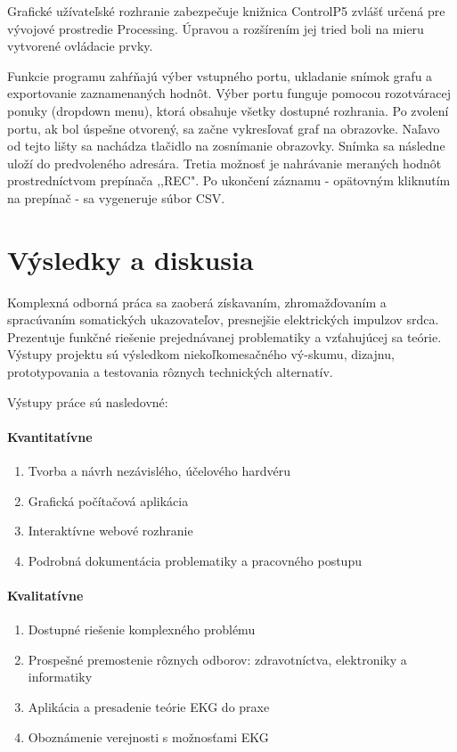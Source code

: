 \documentclass[titlepage,12pt]{article}
\begin{document}
Grafické užívateľské rozhranie zabezpečuje knižnica ControlP5 zvlášť určená pre vývojové prostredie Processing. Úpravou a rozšírením jej tried boli na mieru vytvorené ovládacie prvky.  

Funkcie programu zahŕňajú výber vstupného portu, ukladanie snímok grafu a exportovanie zaznamenaných hodnôt. Výber portu funguje pomocou rozotváracej ponuky (dropdown menu), ktorá obsahuje všetky dostupné rozhrania. Po zvolení portu, ak bol úspešne otvorený, sa začne vykresľovať graf na obrazovke. Naľavo od tejto lišty sa nachádza tlačidlo na zosnímanie obrazovky. Snímka sa následne uloží do predvoleného adresára. Tretia možnosť je nahrávanie meraných hodnôt prostredníctvom prepínača ,,REC". Po ukončení záznamu - opätovným kliknutím na prepínač - sa vygeneruje súbor CSV.


\newpage
\section{Výsledky a diskusia}
Komplexná odborná práca sa zaoberá získavaním, zhromažďovaním a spracúvaním somatických ukazovateľov, presnejšie elektrických impulzov srdca. Prezentuje funkčné riešenie prejednávanej problematiky a vzťahujúcej sa teórie. Výstupy projektu sú výsledkom niekoľkomesačného vý-skumu, dizajnu, prototypovania a testovania rôznych technických alternatív.

Výstupy práce sú nasledovné:
\paragraph{\textbf{Kvantitatívne}}
\begin{enumerate}
	\item Tvorba a návrh nezávislého, účelového hardvéru
	\item Grafická počítačová aplikácia
	\item Interaktívne webové rozhranie
	\item Podrobná dokumentácia problematiky a pracovného postupu
\end{enumerate}
\paragraph{\textbf{Kvalitatívne}}
\begin{enumerate}
	\item Dostupné riešenie komplexného problému
	\item Prospešné premostenie rôznych odborov: zdravotníctva, elektroniky a informatiky
	\item Aplikácia a presadenie teórie EKG do praxe
	\item Oboznámenie verejnosti s možnosťami EKG
\end{enumerate}
\end{document}

